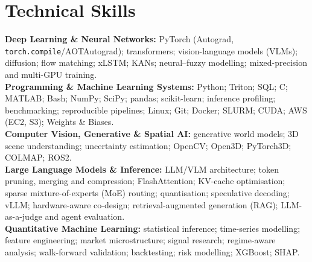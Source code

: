 \section{Technical Skills}

{\small
\textbf{Deep Learning \& Neural Networks:} PyTorch (Autograd, \texttt{torch.compile}/AOTAutograd); transformers; vision-language models (VLMs); diffusion; flow matching; xLSTM; KANs; neural--fuzzy modelling; mixed-precision and multi-GPU training.\\
\textbf{Programming \& Machine Learning Systems:} Python; Triton; SQL; C; MATLAB; Bash; NumPy; SciPy; pandas; scikit-learn; inference profiling; benchmarking; reproducible pipelines; Linux; Git; Docker; SLURM; CUDA; AWS (EC2, S3); Weights \& Biases.\\
\textbf{Computer Vision, Generative \& Spatial AI:} generative world models; 3D scene understanding; uncertainty estimation; OpenCV; Open3D; PyTorch3D; COLMAP; ROS2.\\
\textbf{Large Language Models \& Inference:} LLM/VLM architecture; token pruning, merging and compression; FlashAttention; KV-cache optimisation; sparse mixture-of-experts (MoE) routing; quantisation; speculative decoding; vLLM; hardware-aware co-design; retrieval-augmented generation (RAG); LLM-as-a-judge and agent evaluation.\\
\textbf{Quantitative Machine Learning:} statistical inference; time-series modelling; feature engineering; market microstructure; signal research; regime-aware analysis; walk-forward validation; backtesting; risk modelling; XGBoost; SHAP.
}
